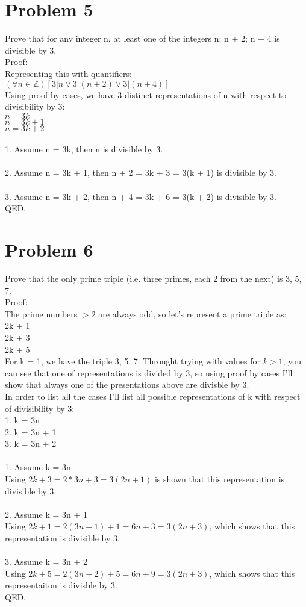 \documentclass{article}
\begin{document}
\section*{Problem 5}
Prove that for any integer n, at least one of the integers n; n + 2; n + 4 is divisible by 3.\\
Proof:\\
Representing this with quantifiers:\\
$(\forall n \in \mathbb{Z})[3 | n \vee 3 | (n + 2) \vee 3 | (n + 4)]$\\
Using proof by cases, we have 3 distinct representations of n with respect to divisibility by 3:\\
$n = 3k$\\
$n = 3k + 1$\\
$n = 3k + 2$\\
\\
1. Assume n = 3k, then n is divisible by 3.\\
\\
2. Assume n = 3k + 1, then n + 2 = 3k + 3 = 3(k + 1) is divisible by 3.\\
\\
3. Assume n = 3k + 2, then n + 4 = 3k + 6 = 3(k + 2) is divisible by 3.\\
QED.

\section*{Problem 6}
Prove that the only prime triple (i.e. three primes, each 2 from the next) is 3, 5, 7.\\
Proof:\\
The prime numbers $> 2$ are always odd, so let's represent a prime triple as:\\
2k + 1\\
2k + 3\\
2k + 5\\
For k = 1, we have the triple 3, 5, 7. Throught trying with values for $k > 1$, you can see that one of representations is divided by 3, so using proof by cases I'll show that always one of the presentations above are divisble by 3.\\
In order to list all the cases I'll list all possible representations of k with respect of divisibility by 3:\\
1. k = 3n\\
2. k = 3n + 1\\
3. k = 3n + 2\\
\\
1. Assume k = 3n\\
Using $2k + 3 = 2*3n + 3 = 3(2n + 1)$ is shown that this representation is divisible by 3.\\
\\
2. Assume k = 3n + 1\\
Using $2k + 1 = 2(3n + 1) + 1 = 6n + 3 = 3(2n+3)$, which shows that this representation is divisible by 3.\\
\\
3. Assume k = 3n + 2\\
Using $2k + 5 = 2(3n+2) + 5 = 6n + 9 = 3(2n + 3)$, which shows that this representaiton is divisble by 3.\\
QED.
\end{document}
